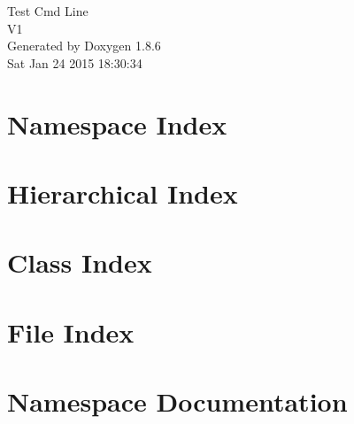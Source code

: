 \documentclass[twoside]{book}
\newcommand{\clearemptydoublepage}{%
  \newpage{\pagestyle{empty}\cleardoublepage}%
}
\begin{document}
\hypersetup{pageanchor=false}
\begin{titlepage}
\vspace*{7cm}
\begin{center}%
{\Large Test Cmd Line \\[1ex]\large V1 }\\
\vspace*{1cm}
{\large Generated by Doxygen 1.8.6}\\
\vspace*{0.5cm}
{\small Sat Jan 24 2015 18:30:34}\\
\end{center}
\end{titlepage}
\clearemptydoublepage
\tableofcontents
\clearemptydoublepage
{}
\hypersetup{pageanchor=true}

\chapter{Namespace Index}

\chapter{Hierarchical Index}

\chapter{Class Index}

\chapter{File Index}

\chapter{Namespace Documentation}















\end{document}
